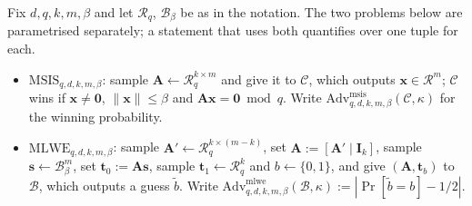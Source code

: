 \documentclass{aicr-conjecture}
\newcommand{\Adv}{\mathrm{Adv}}
\newcommand{\Advmsis}{\Adv^{\mathrm{msis}}}
\newcommand{\Advmlwe}{\Adv^{\mathrm{mlwe}}}
\newcommand{\MSIS}{\mathrm{MSIS}}
\newcommand{\MLWE}{\mathrm{MLWE}}
\newcommand{\Rr}{\mathcal{R}}
\newcommand{\Rq}{\mathcal{R}_q}
\newcommand{\Ball}{\mathcal{B}}
\newcommand{\bA}{\mathbf{A}}
\newcommand{\bx}{\mathbf{x}}
\newcommand{\bsv}{\mathbf{s}}
\newcommand{\btv}{\mathbf{t}}
\newcommand{\bI}{\mathbf{I}}
\newcommand{\bzero}{\mathbf{0}}
\begin{document}
\begin{definition}\label{def:lattice}
Fix $d, q, k, m, \beta$ and let $\Rq$, $\Ball_\beta$ be as in the
notation. The two problems below are parametrised separately; a
statement that uses both quantifies over one tuple for each.
\begin{itemize}[leftmargin=1.2em]
\item $\MSIS_{q,d,k,m,\beta}$: sample
$\bA \gets \Rq^{k \times m}$ and give it to $\mathcal{C}$, which
outputs $\bx \in \Rr^{m}$; $\mathcal{C}$ wins if $\bx \ne \bzero$,
$\|\bx\| \le \beta$ and $\bA\bx = \bzero \bmod q$. Write
$\Advmsis_{q,d,k,m,\beta}(\mathcal{C},\kappa)$ for the winning
probability.
\item $\MLWE_{q,d,k,m,\beta}$: sample
$\bA' \gets \Rq^{k \times (m-k)}$, set $\bA := [\bA' \mid \bI_k]$,
sample $\bsv \gets \Ball_\beta^{m}$, set $\btv_0 := \bA\bsv$, sample
$\btv_1 \gets \Rq^{k}$ and $b \gets \{0,1\}$, and give
$(\bA, \btv_b)$ to $\mathcal{B}$, which outputs a guess $\tilde{b}$.
Write $\Advmlwe_{q,d,k,m,\beta}(\mathcal{B},\kappa) :=
|\Pr[\tilde{b} = b] - 1/2|$.
\end{itemize}
\end{definition}
\end{document}
